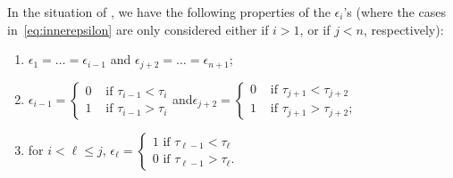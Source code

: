 \documentclass[10pt]{amsart}
\theoremstyle{definition}\newtheorem{rema}[theo]{Remark}\newtheorem{exem}[theo]{Example}
\begin{document}
\begin{prop}\label{prop:weightsAn}
In the situation of , we have the following properties of the $\epsilon_i$'s (where the cases in~\eqref{eq:innerepsilon} are only considered either if $i>1$, or if $j<n$, respectively):
\begin{enumerate}%
\item $\epsilon_1 = \dots = \epsilon_{i-1}$ and $\epsilon_{j+2} = \dots = \epsilon_{n+1}$;
\item\label{eq:innerepsilon}
$\epsilon_{i-1} =
\begin{cases}
0 &\text{ if } \tau_{i-1} < \tau_{i } \\
1 &\text{ if } \tau_{i-1} > \tau_{i }
\end{cases}$\quad and\quad $\epsilon_{j+2} =
\begin{cases}
0 &\text{ if }\tau_{j+1} < \tau_{j+2} \\
1 &\text{ if }\tau_{j+1} > \tau_{j+2};
\end{cases}$
\item\label{it:innerepsilon}
for $i<\ell\leq j$, $\epsilon_\ell =
\begin{cases}
1 \text{ if }\tau_{\ell-1} < \tau_\ell \\
0 \text{ if }\tau_{\ell-1} > \tau_\ell.
\end{cases}$
\end{enumerate}
\end{prop}
\end{document}

